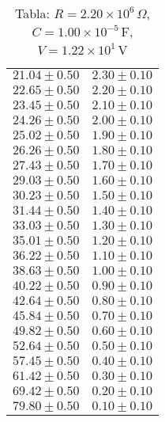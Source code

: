 \begin{table}[H]
\begin{tabular}{|c|c|}
$21.04 \pm 0.50$ & $2.30 \pm 0.10$ \\
$22.65 \pm 0.50$ & $2.20 \pm 0.10$ \\
$23.45 \pm 0.50$ & $2.10 \pm 0.10$ \\
$24.26 \pm 0.50$ & $2.00 \pm 0.10$ \\
$25.02 \pm 0.50$ & $1.90 \pm 0.10$ \\
$26.26 \pm 0.50$ & $1.80 \pm 0.10$ \\
$27.43 \pm 0.50$ & $1.70 \pm 0.10$ \\
$29.03 \pm 0.50$ & $1.60 \pm 0.10$ \\
$30.23 \pm 0.50$ & $1.50 \pm 0.10$ \\
$31.44 \pm 0.50$ & $1.40 \pm 0.10$ \\
$33.03 \pm 0.50$ & $1.30 \pm 0.10$ \\
$35.01 \pm 0.50$ & $1.20 \pm 0.10$ \\
$36.22 \pm 0.50$ & $1.10 \pm 0.10$ \\
$38.63 \pm 0.50$ & $1.00 \pm 0.10$ \\
$40.22 \pm 0.50$ & $0.90 \pm 0.10$ \\
$42.64 \pm 0.50$ & $0.80 \pm 0.10$ \\
$45.84 \pm 0.50$ & $0.70 \pm 0.10$ \\
$49.82 \pm 0.50$ & $0.60 \pm 0.10$ \\
$52.64 \pm 0.50$ & $0.50 \pm 0.10$ \\
$57.45 \pm 0.50$ & $0.40 \pm 0.10$ \\
$61.42 \pm 0.50$ & $0.30 \pm 0.10$ \\
$69.42 \pm 0.50$ & $0.20 \pm 0.10$ \\
$79.80 \pm 0.50$ & $0.10 \pm 0.10$ \\
\hline
\end{tabular}
\caption*{Tabla: $R = 2.20 \times 10^{6}\,\Omega$, $C = 1.00 \times 10^{-5}$\,F, $V = 1.22 \times 10^{1}$\,V}
\end{table}

